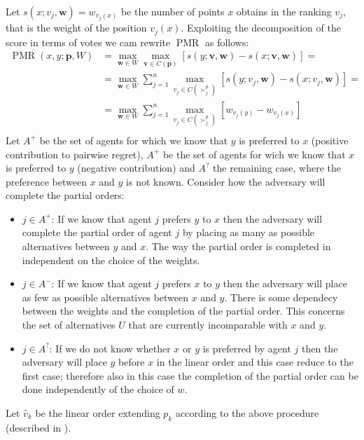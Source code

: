 \documentclass[12pt]{article}
\newcommand{\profile}{\textbf{v}}%
\newcommand{\pprofile}{\textbf{p}}%
\newcommand{\w}{\textbf{w}}%
\DeclareMathOperator{\PMR}{PMR}
\begin{document}
Let $s(x; v_j,\w)=w_{v_j(x)}$ be the number of points $x$ obtains in the ranking $v_j$, that is the weight of the position $v_j(x)$.
Exploiting the decomposition of the score in terms of votes we cam rewrite $\PMR$ as follows:
\begin{align*}
\PMR(x,y; \pprofile, W) &= \max_{\w \in W} \max_{\profile \in C(\pprofile)} [ s(y; \profile,\w) - s(x; \profile,\w) ] = \\
&=  \max_{\w \in W} \sum_{j=1}^{n} \max_{v_j \in C(\succ_j^p)} [s(y; v_j,\w) - s(x; v_j,\w)]=\\
&=  \max_{\w \in W} \sum_{j=1}^{n} \max_{v_j \in C(\succ_j^p)} [w_{v_j(y)} - w_{v_j(x)}] \\
\end{align*}
Let $A^+$ be the set of agents for which we know that $y$ is preferred to $x$ (positive contribution to pairwise regret), $A^+$ 
be the set of agents for wich we  know that $x$ is preferred to $y$ (negative contribution) and $A^?$ the remaining case, where the preference between $x$ and $y$ is not known.
Consider how the adversary will complete the partial orders:
\begin{itemize}
 \item $j \in A^+$: If we know that agent $j$ prefers $y$ to $x$ then the adversary will complete the partial order of agent $j$ by placing as many as possible alternatives between $y$ and $x$.
 The way the partial order is completed in independent on the choice of the weights.

 \item $j \in A^-$: If we know that agent $j$ prefers $x$ to $y$ then the adversary will place as few as possible alternatives between $x$ and $y$.
 There is some dependecy between the weights and the completion of the partial order.
 This concerns the set of alternatives $U$ that are currently incomparable with $x$ and $y$.
 
 \item $j \in A^?$: If we do not know whether $x$ or $y$ is preferred by agent $j$ then the adversary will place $y$ before $x$ in the linear order and this case reduce to the first case; therefore also in this case the completion of the partial order can be done independently of the choice of $w$.
\end{itemize}

Let $\hat{v}_k$ be the linear order extending $p_k$ according to the above procedure (described in \cite{Lu2011}).
\end{document}
